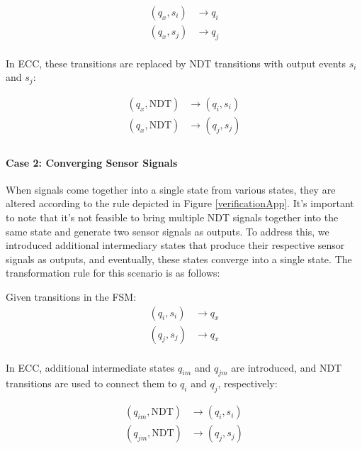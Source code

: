 \begin{bibunit}
\[
\begin{aligned}
(q_x, s_i) & \rightarrow q_i \\
(q_x, s_j) & \rightarrow q_j \\
\end{aligned}
\]



In ECC, these transitions are replaced by NDT transitions with output events $s_i$ and $s_j$:



\[
\begin{aligned}
(q_x, \text{NDT}) & \rightarrow (q_i, s_i) \\
(q_x, \text{NDT}) & \rightarrow (q_j, s_j) \\
\end{aligned}
\]


\paragraph{Case 2: Converging Sensor Signals }



When signals come together into a single state from various states, they are altered according to the rule depicted in Figure \ref{verificationApp}. It's important to note that it's not feasible to bring multiple NDT signals together into the same state and generate two sensor signals as outputs. To address this, we introduced additional intermediary states that produce their respective sensor signals as outputs, and eventually, these states converge into a single state. The transformation rule for this scenario is as follows:



Given transitions in the FSM:
\[
\begin{aligned}
(q_i, s_i) & \rightarrow q_x \\
(q_j, s_j) & \rightarrow q_x \\
\end{aligned}
\]



In ECC, additional intermediate states $q_{im}$ and $q_{jm}$ are introduced, and NDT transitions are used to connect them to $q_i$ and $q_j$, respectively:


\[
\begin{aligned}
(q_{im}, \text{NDT}) & \rightarrow (q_i, s_i) \\
(q_{jm}, \text{NDT}) & \rightarrow (q_j, s_j) \\
\end{aligned}
\]



\end{bibunit}
